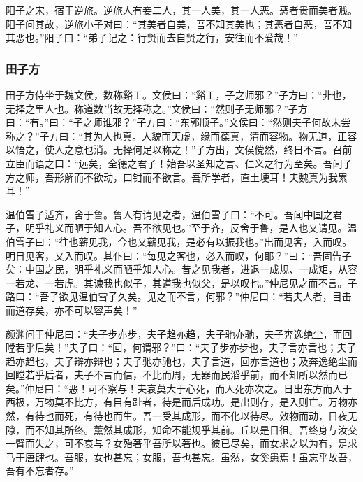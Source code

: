 \documentclass[]{article}
\begin{document}
阳子之宋，宿于逆旅。逆旅人有妾二人，其一人美，其一人恶。恶者贵而美者贱。阳子问其故，逆旅小子对曰：``其美者自美，吾不知其美也；其恶者自恶，吾不知其恶也。''阳子曰：``弟子记之：行贤而去自贤之行，安往而不爱哉！''

\hypertarget{header-n347}{%
\subsubsection{田子方}\label{header-n347}}

田子方侍坐于魏文侯，数称谿工。文侯曰：``谿工，子之师邪？''子方曰：``非也，无择之里人也。称道数当故无择称之。''文侯曰：``然则子无师邪？''子方曰：``有。''曰：``子之师谁邪？''子方曰：``东郭顺子。''文侯曰：``然则夫子何故未尝称之？''子方曰：``其为人也真。人貌而天虚，缘而葆真，清而容物。物无道，正容以悟之，使人之意也消。无择何足以称之！''子方出，文侯傥然，终日不言。召前立臣而语之曰：``远矣，全德之君子！始吾以圣知之言、仁义之行为至矣。吾闻子方之师，吾形解而不欲动，口钳而不欲言。吾所学者，直土埂耳！夫魏真为我累耳！''

温伯雪子适齐，舍于鲁。鲁人有请见之者，温伯雪子曰：``不可。吾闻中国之君子，明乎礼义而陋于知人心。吾不欲见也。''至于齐，反舍于鲁，是人也又请见。温伯雪子曰：``往也蕲见我，今也又蕲见我，是必有以振我也。''出而见客，入而叹。明日见客，又入而叹。其仆曰：``每见之客也，必入而叹，何耶？''曰：``吾固告子矣：中国之民，明乎礼义而陋乎知人心。昔之见我者，进退一成规、一成矩，从容一若龙、一若虎。其谏我也似子，其道我也似父，是以叹也。''仲尼见之而不言。子路曰：``吾子欲见温伯雪子久矣。见之而不言，何邪？''仲尼曰：``若夫人者，目击而道存矣，亦不可以容声矣！''

颜渊问于仲尼曰：``夫子步亦步，夫子趋亦趋，夫子驰亦驰，夫子奔逸绝尘，而回瞠若乎后矣！''夫子曰：``回，何谓邪？''曰：``夫子步亦步也，夫子言亦言也；夫子趋亦趋也，夫子辩亦辩也；夫子驰亦驰也，夫子言道，回亦言道也；及奔逸绝尘而回瞠若乎后者，夫子不言而信，不比而周，无器而民滔乎前，而不知所以然而已矣。''仲尼曰：``恶！可不察与！夫哀莫大于心死，而人死亦次之。日出东方而入于西极，万物莫不比方，有目有趾者，待是而后成功。是出则存，是入则亡。万物亦然，有待也而死，有待也而生。吾一受其成形，而不化以待尽。效物而动，日夜无隙，而不知其所终。薰然其成形，知命不能规乎其前。丘以是日徂。吾终身与汝交一臂而失之，可不哀与？女殆著乎吾所以著也。彼已尽矣，而女求之以为有，是求马于唐肆也。吾服，女也甚忘；女服，吾也甚忘。虽然，女奚患焉！虽忘乎故吾，吾有不忘者存。''
\end{document}
